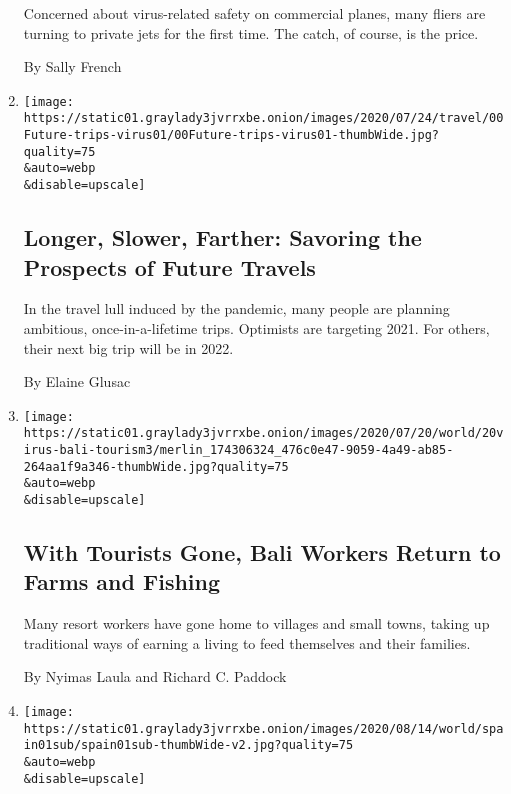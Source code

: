 \begin{enumerate}
  Concerned about virus-related safety on commercial planes, many fliers
  are turning to private jets for the first time. The catch, of course,
  is the price.

  By Sally French
\item
  \href{/2020/07/28/travel/future-travel-bucket-list-coronavirus.html}{}

  \texttt{[image: https://static01.graylady3jvrrxbe.onion/images/2020/07/24/travel/00Future-trips-virus01/00Future-trips-virus01-thumbWide.jpg?quality=75\\\&auto=webp\\\&disable=upscale]}

  \hypertarget{longer-slower-farther-savoring-the-prospects-of-future-travels}{%
  \subsection{Longer, Slower, Farther: Savoring the Prospects of Future
  Travels}\label{longer-slower-farther-savoring-the-prospects-of-future-travels}}

  In the travel lull induced by the pandemic, many people are planning
  ambitious, once-in-a-lifetime trips. Optimists are targeting 2021. For
  others, their next big trip will be in 2022.

  By Elaine Glusac
\item
  \href{/2020/07/20/world/asia/bali-tourism-coronavirus.html}{}

  \texttt{[image: https://static01.graylady3jvrrxbe.onion/images/2020/07/20/world/20virus-bali-tourism3/merlin\_174306324\_476c0e47-9059-4a49-ab85-264aa1f9a346-thumbWide.jpg?quality=75\\\&auto=webp\\\&disable=upscale]}

  \hypertarget{with-tourists-gone-bali-workers-return-to-farms-and-fishing}{%
  \subsection{With Tourists Gone, Bali Workers Return to Farms and
  Fishing}\label{with-tourists-gone-bali-workers-return-to-farms-and-fishing}}

  Many resort workers have gone home to villages and small towns, taking
  up traditional ways of earning a living to feed themselves and their
  families.

  By Nyimas Laula and Richard C. Paddock
\item
  \href{/2020/07/19/world/europe/tourism-virus-europe.html}{}

  \texttt{[image: https://static01.graylady3jvrrxbe.onion/images/2020/08/14/world/spain01sub/spain01sub-thumbWide-v2.jpg?quality=75\\\&auto=webp\\\&disable=upscale]}


\end{enumerate}
